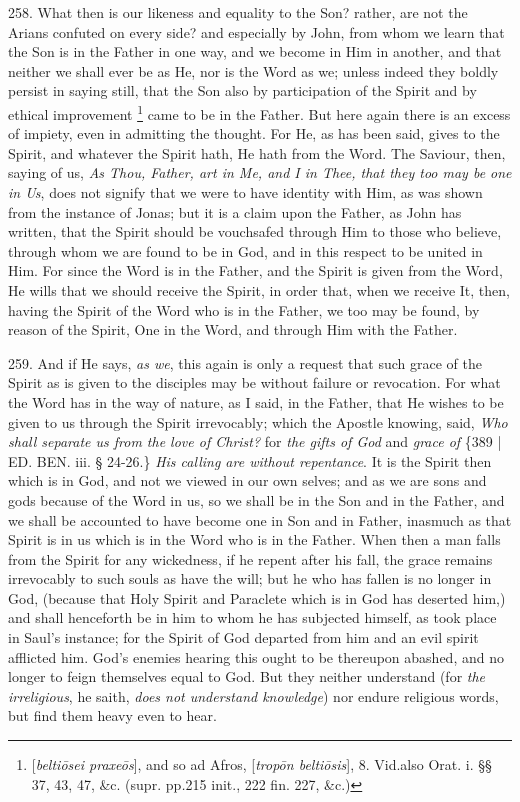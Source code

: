 258. What then is our likeness and
equality to the Son? rather, are not the Arians confuted on every
side? and especially by John, from whom we learn that the Son is in
the Father in one way, and we become in Him in another, and that
neither we shall ever be as He, nor is the Word as we; unless indeed
they boldly persist in saying still, that the Son also by
participation of the Spirit and by ethical improvement \footnote{[\emph{belti\={o}sei praxe\={o}s}], and so ad Afros, [\emph{trop\={o}n
belti\={o}sis}], 8. Vid.\emph{}also Orat. i. §§ 37, 43, 47,
\&c. (supr. pp\emph{.}215 init., 222 fin. 227, \&c.)} came to be in the Father. But here again there is an excess of
impiety, even in admitting the thought. For He, as has been said,
gives to the Spirit, and whatever the Spirit hath, He hath from the
Word. The Saviour, then, saying of us, \emph{As Thou, Father, art in Me,
and I in Thee, that they too may be one in Us}, does not signify
that we were to have identity with Him, as was shown from the instance
of Jonas; but it is a claim upon the Father, as John has written, that
the Spirit should be vouchsafed through Him to those who believe,
through whom we are found to be in God, and in this respect to be
united in Him. For since the Word is in the Father, and the Spirit is
given from the Word, He wills that we should receive the Spirit, in
order that, when we receive It, then, having the Spirit of the Word
who is in the Father, we too may be found, by reason of the Spirit,
One in the Word, and through Him with the Father.

259. And if
He says, \emph{as we}, this again is only a request that such grace of
the Spirit as is given to the disciples may be without failure or
revocation. For what the Word has in the way of nature, as I said, in
the Father, that He wishes to be given to us through the Spirit
irrevocably; which the Apostle knowing, said, \emph{Who shall separate us
from the love of Christ?} for \emph{the gifts of God} and \emph{grace
of} \{389 | ED. BEN. iii. § 24-26.\} \emph{His
calling are without repentance}. It is the Spirit then which is in
God, and not we viewed in our own selves; and as we are sons and gods
because of the Word in us, so we shall be in the Son and in the
Father, and we shall be accounted to have become one in Son and in
Father, inasmuch as that Spirit is in us which is in the Word who is
in the Father. When then a man falls from the Spirit for any
wickedness, if he repent after his fall, the grace remains irrevocably
to such souls as have the will; but he who has fallen is no longer in
God, (because that Holy Spirit and Paraclete which is in God has
deserted him,) and shall henceforth be in him to whom he has subjected
himself, as took place in Saul's instance; for the Spirit of God
departed from him and an evil spirit afflicted him. God's enemies
hearing this ought to be thereupon abashed, and no longer to feign
themselves equal to God. But they neither understand (for \emph{the
irreligious}, he saith, \emph{does not understand knowledge}) nor
endure religious words, but find them heavy even to hear.

